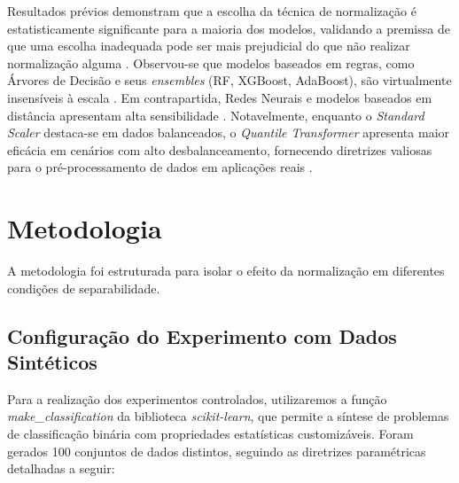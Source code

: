 Resultados prévios demonstram que a escolha da técnica de normalização é estatisticamente significante para a maioria dos modelos, validando a premissa de que uma escolha inadequada pode ser mais prejudicial do que não realizar normalização alguma \cite{Amorim2023}. Observou-se que modelos baseados em regras, como Árvores de Decisão e seus \textit{ensembles} (RF, XGBoost, AdaBoost), são virtualmente insensíveis à escala \cite{Amorim2023}. Em contrapartida, Redes Neurais e modelos baseados em distância apresentam alta sensibilidade \cite{Amorim2023}. Notavelmente, enquanto o \textit{Standard Scaler} destaca-se em dados balanceados, o \textit{Quantile Transformer} apresenta maior eficácia em cenários com alto desbalanceamento, fornecendo diretrizes valiosas para o pré-processamento de dados em aplicações reais \cite{Amorim2023}.


\section{Metodologia}
A metodologia foi estruturada para isolar o efeito da normalização em diferentes condições de separabilidade.

\subsection{Configuração do Experimento com Dados Sintéticos}

Para a realização dos experimentos controlados, utilizaremos a função \textit{make\_classification} da biblioteca \textit{scikit-learn}, que permite a síntese de problemas de classificação binária com propriedades estatísticas customizáveis. Foram gerados 100 conjuntos de dados distintos, seguindo as diretrizes paramétricas detalhadas a seguir:

